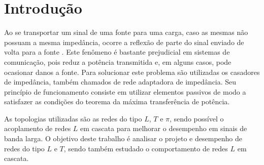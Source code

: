 \newpage

\section{Introdução}
Ao se transportar um sinal de uma fonte para uma carga, caso as mesmas não possuam a mesma impedância, ocorre a reflexão de parte do sinal enviado de volta para a fonte \cite{Rhea}. Este fenômeno é bastante prejudicial em sistemas de comunicação, pois reduz a potência transmitida e, em alguns casos, pode ocasionar danos a fonte. Para solucionar este problema são utilizadas os casadores de impedância, também chamados de rede adaptadora de impedância. Seu princípio de funcionamento consiste em utilizar elementos passivos de modo a satisfazer as condições do teorema da máxima transferência de potência. 

As topologias utilizadas são as redes do tipo $L$, $T$ e $\pi$, sendo possível o acoplamento de redes $L$ em cascata para melhorar o desempenho em sinais de banda larga.
O objetivo deste trabalho é analisar o projeto e desempenho de redes do tipo $L$ e $T$, sendo também estudado o comportamento de redes $L$ em cascata.